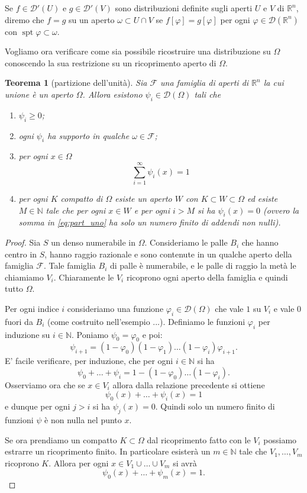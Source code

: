 \documentclass[italian,a4paper,oneside,headinclude]{scrbook}
\renewcommand{\phi}{\varphi}
\newcommand{\D}{\mathcal D}
\newcommand{\F}{\mathcal F}
\newcommand{\NN}{\mathbb N}
\newcommand{\RR}{\mathbb R}
\DeclareMathOperator{\spt}{spt}
\newtheorem{theorem}{Teorema}
\begin{document}
Se $f\in \D'(U)$ e $g\in \D'(V)$ sono distribuzioni definite sugli
aperti $U$ e $V$ di $\RR^n$, diremo che $f=g$ su un aperto
$\omega\subset U\cap V$ se $f[\phi] = g[\phi]$ per ogni
$\phi \in \D(\RR^n)$ con $\spt \phi \subset \omega$.

Vogliamo ora verificare come sia possibile ricostruire una
distribuzione su $\Omega$ conoscendo la sua restrizione su un
ricoprimento aperto di $\Omega$.

\begin{theorem}[partizione dell'unità]\label{th:part1}
  \cite[6.20]{Rudin}
    Sia $\F$ una famiglia di aperti di $\RR^n$ la cui unione è un aperto $\Omega$. Allora esistono $\psi_i\in \D(\Omega)$ tali che
    \begin{enumerate}
    \item $\psi_i\ge 0$;
    \item ogni $\psi_i$ ha supporto in qualche $\omega\in \F$;
    \item per ogni $x\in \Omega$
    \begin{equation}\label{eq:part_uno}
      \sum_{i=1}^\infty \psi_i(x) = 1
    \end{equation}
    \item per ogni $K$ compatto di $\Omega$ esiste un aperto $W$ con $K\subset W \subset \Omega$ ed esiste $M\in \NN$ tale che per ogni $x\in W$ e per ogni $i > M$ si ha $\psi_i(x)=0$ (ovvero la somma in \eqref{eq:part_uno} ha solo un numero finito di addendi non nulli).
    \end{enumerate}
\end{theorem}
%
\begin{proof}
  Sia $S$ un denso numerabile in $\Omega$. Consideriamo le palle $B_i$
  che hanno centro in $S$, hanno raggio razionale e sono contenute in
  un qualche aperto della famiglia $\F$. Tale famiglia $B_i$ di palle è
  numerabile, e le palle di raggio la metà le chiamiamo $V_i$.
  Chiaramente le $V_i$ ricoprono ogni aperto della famiglia e quindi
  tutto $\Omega$.

  Per ogni indice $i$ consideriamo una funzione $\phi_i\in \D(\Omega)$
  che vale $1$ su $V_i$ e vale $0$ fuori da $B_i$ (come costruito
  nell'esempio ...).
  Definiamo le funzioni $\phi_i$ per induzione su $i\in \NN$.
  Poniamo $\psi_0 = \phi_0$ e poi:
  \[
  \psi_{i+1} = (1-\phi_0)(1-\phi_1)\dots (1-\phi_i)\phi_{i+1}.
  \]
  E' facile verificare, per induzione, che per ogni $i\in\NN$ si ha
  \[
  \psi_0 + \dots + \psi_i  = 1 - (1-\phi_0)\dots (1-\phi_i).
  \]
  Osserviamo ora che se $x\in V_i$ allora dalla relazione precedente
  si ottiene
  \[
  \psi_0(x) + \dots + \psi_i(x) = 1
  \]
  e dunque per ogni $j>i$ si ha $\psi_j(x)=0$. Quindi solo un numero finito
  di funzioni $\psi$ è non nulla nel punto $x$.

  Se ora prendiamo un compatto $K\subset \Omega$ dal ricoprimento
  fatto con le $V_i$ possiamo estrarre un ricoprimento finito. In
  particolare esisterà un $m\in \NN$ tale che $V_1,\dots, V_m$
  ricoprono $K$. Allora per ogni $x\in V_1\cup \dots\cup V_m$ si avrà
  \[
  \psi_0(x) + \dots + \psi_m(x) = 1.
  \]
\end{proof}
\end{document}
